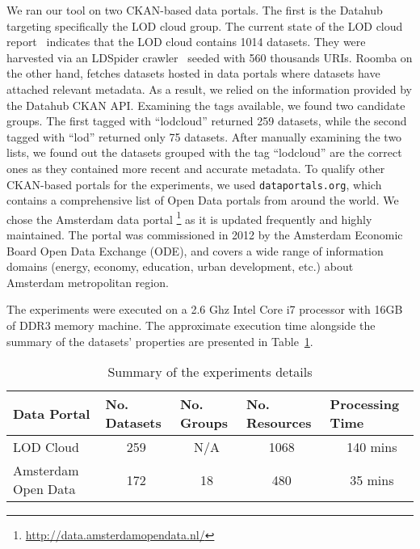 We ran our tool on two CKAN-based data portals. The first is the Datahub targeting specifically the LOD cloud group. The current state of the LOD cloud report~\cite{Schmachtenberg:ISWC:14} indicates that the LOD cloud contains 1014 datasets. They were harvested via an LDSpider crawler~\cite{Isele:ISWC:10} seeded with 560 thousands URIs. Roomba on the other hand, fetches datasets hosted in data portals where datasets have attached relevant metadata. As a result, we relied on the information provided by the Datahub CKAN API. Examining the tags available, we found two candidate groups. The first tagged with ``lodcloud'' returned 259 datasets, while the second tagged with ``lod'' returned only 75 datasets. After manually examining the two lists, we found out the datasets grouped with the tag ``lodcloud'' are the correct ones as they contained more recent and accurate metadata. To qualify other CKAN-based portals for the experiments, we used \texttt{dataportals.org}, which contains a comprehensive list of Open Data portals from around the world. We chose the Amsterdam data portal \footnote{\url{http://data.amsterdamopendata.nl/}} as it is updated frequently and highly maintained. The portal was commissioned in 2012 by the Amsterdam Economic Board Open Data Exchange (ODE), and covers a wide range of information domains (energy, economy, education, urban development, etc.) about Amsterdam metropolitan region.

The experiments were executed on a 2.6 Ghz Intel Core i7 processor with 16GB of DDR3 memory machine. The approximate execution time alongside the summary of the datasets' properties are presented in Table~\ref{table:data_portals_experiments}.

\begin{table}[ht]
\centering
\begin{tabular}{|l|c|c|c|c|}
\hline
Data Portal         & \multicolumn{1}{l|}{No. Datasets} & \multicolumn{1}{l|}{No. Groups} & \multicolumn{1}{l|}{No. Resources} & \multicolumn{1}{l|}{Processing Time} \\ \hline
LOD Cloud           & 259                               & N/A                            & 1068                               & ~140 mins                            \\ \hline
Amsterdam Open Data & 172                               & 18                             & 480                                & ~35 mins                             \\ \hline
\end{tabular}
\caption{Summary of the experiments details}
\label{table:data_portals_experiments}
\end{table}

